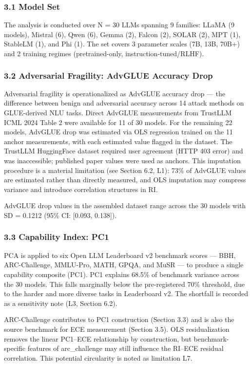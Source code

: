 
\subsubsection{3.1 Model Set}

The analysis is conducted over N = 30 LLMs spanning 9 families: LLaMA (9 models), Mistral (6), Qwen (6), Gemma (2), Falcon (2), SOLAR (2), MPT (1), StableLM (1), and Phi (1). The set covers 3 parameter scales (7B, 13B, 70B+) and 2 training regimes (pretrained-only, instruction-tuned/RLHF).

\subsubsection{3.2 Adversarial Fragility: AdvGLUE Accuracy Drop}

Adversarial fragility is operationalized as AdvGLUE accuracy drop — the difference between benign and adversarial accuracy across 14 attack methods on GLUE-derived NLU tasks. Direct AdvGLUE measurements from TrustLLM ICML 2024 Table 2 were available for 11 of 30 models. For the remaining 22 models, AdvGLUE drop was estimated via OLS regression trained on the 11 anchor measurements, with each estimated value flagged in the dataset. The TrustLLM HuggingFace dataset required user agreement (HTTP 403 error) and was inaccessible; published paper values were used as anchors. This imputation procedure is a material limitation (see Section 6.2, L1): 73\% of AdvGLUE values are estimated rather than directly measured, and OLS imputation may compress variance and introduce correlation structures in RI.

AdvGLUE drop values in the assembled dataset range across the 30 models with SD = 0.1212 (95\% CI: [0.093, 0.138]).

\subsubsection{3.3 Capability Index: PC1}

PCA is applied to six Open LLM Leaderboard v2 benchmark scores — BBH, ARC-Challenge, MMLU-Pro, MATH, GPQA, and MuSR — to produce a single capability composite (PC1). PC1 explains 68.5\% of benchmark variance across the 30 models. This falls marginally below the pre-registered 70\% threshold, due to the harder and more diverse tasks in Leaderboard v2. The shortfall is recorded as a sensitivity note (L3, Section 6.2).

ARC-Challenge contributes to PC1 construction (Section 3.3) and is also the source benchmark for ECE measurement (Section 3.5). OLS residualization removes the linear PC1–ECE relationship by construction, but benchmark-specific features of arc_challenge may still influence the RI–ECE residual correlation. This potential circularity is noted as limitation L7.

